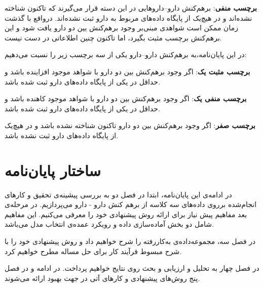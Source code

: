 \textbf{برچسب منفی}:
برهم‌کنش دارو–داروهایی در این دسته قرار‌ می‌گیرند که تاکنون شناخته‌ نشده‌اند و در هیچ‌یک از پایگاه داده‌های مربوط به دارو ثبت نشده‌اند. در‌واقع با گذشت زمان ممکن‌ است شواهدی مبنی‌بر وجود برهم‌کنش بین دو دارو یافت شود و این برهم‌کنش برچسب مثبت بگیرد، اما تاکنون چنین اطلاعاتی در دست نیست.
\par
در این پایان‌نامه،به برهم‌کنش دارو–دارو  یکی از سه برچسب زیر را نسبت می‌دهیم:

\textbf{برچسب مثبت یک}:
اگر وجود برهم‌کنش بین دو دارو با شواهد موجود افزاینده باشد و حداقل در یکی از پایگاه داده‌های دارو ثبت شده‌ باشد.

\textbf{برچسب منفی یک}:
اگر وجود برهم‌کنش بین دو دارو با شواهد موجود کاهنده باشد و حداقل در یکی از پایگاه داده‌های دارو ثبت شده‌ باشد.

\textbf{برچسب صفر}:
اگر وجود برهم‌کنش بین دو دارو تاکنون شناخته نشده‌ باشد و در هیچ‌یک از پایگاه داده‌های دارو ثبت نشده‌ باشد.

\par 

\section{ساختار پایان‌نامه}
در ادامه‌ی این پایان‌نامه، ابتدا در فصل دو به بررسی پیشینه‌ی تحقیق و کار‌های انجام‌شده برروی داد‌ه‌های سه کلاسه از برهم کنش دارو - دارو می‌پردازیم. در مرحله‌ی بعد مفاهیم پیش نیاز برای ارائه روش پیشنهادی خود را معرفی می‌کنیم. این مفاهیم شامل دو بخش آماده‌سازی داده و رویکرد عمده‌ی انتخاب مدل می‌باشد.

در فصل سه، مجموعه‌داده‌ی به‌کار‌رفته را شرح خواهیم داد و روش پیشنهادی خود را با شرح مبسوط فرآیند کار برای حل مساله  مطرح خواهیم کرد. 

در فصل چهار به تحلیل و ارزیابی و بحث روی نتایج خواهیم پرداخت. در ادامه و در فصل پنج روش‌های پیشنهادی و کارهای آتی در جهت بهبود ارائه می‌شوند.

 
